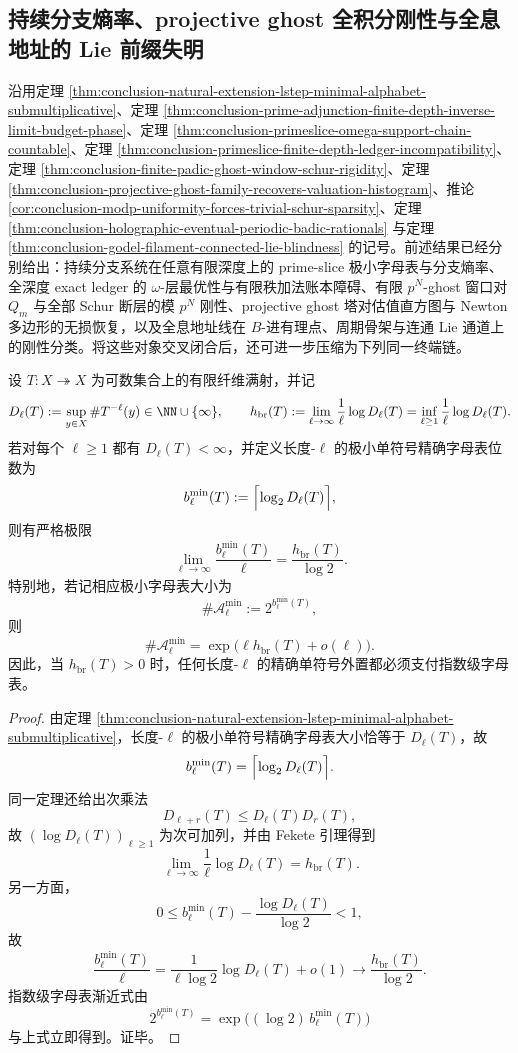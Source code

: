 \subsection{持续分支熵率、projective ghost 全积分刚性与全息地址的 Lie 前缀失明}\label{subsec:conclusion-primeslice-ghost-holographic-lie-zerorate}
沿用定理 \ref{thm:conclusion-natural-extension-lstep-minimal-alphabet-submultiplicative}、定理 \ref{thm:conclusion-prime-adjunction-finite-depth-inverse-limit-budget-phase}、定理 \ref{thm:conclusion-primeslice-omega-support-chain-countable}、定理 \ref{thm:conclusion-primeslice-finite-depth-ledger-incompatibility}、定理 \ref{thm:conclusion-finite-padic-ghost-window-schur-rigidity}、定理 \ref{thm:conclusion-projective-ghost-family-recovers-valuation-histogram}、推论 \ref{cor:conclusion-modp-uniformity-forces-trivial-schur-sparsity}、定理 \ref{thm:conclusion-holographic-eventual-periodic-badic-rationals} 与定理 \ref{thm:conclusion-godel-filament-connected-lie-blindness} 的记号。前述结果已经分别给出：持续分支系统在任意有限深度上的 prime-slice 极小字母表与分支熵率、全深度 exact ledger 的 \(\omega\)-层最优性与有限秩加法账本障碍、有限 \(p^N\)-ghost 窗口对 \(Q_m\) 与全部 Schur 断层的模 \(p^N\) 刚性、projective ghost 塔对估值直方图与 Newton 多边形的无损恢复，以及全息地址线在 \(B\)-进有理点、周期骨架与连通 Lie 通道上的刚性分类。将这些对象交叉闭合后，还可进一步压缩为下列同一终端链。

\begin{theorem}\label{thm:conclusion-branch-entropy-primeslice-rate}
设 \(T:X\twoheadrightarrow X\) 为可数集合上的有限纤维满射，并记
\[
D_\ell(T):=\sup_{y\in X}\#T^{-\ell}(y)\in \NN\cup\{\infty\},
\qquad
h_{\mathrm{br}}(T):=\lim_{\ell\to\infty}\frac{1}{\ell}\log D_\ell(T)
=
\inf_{\ell\ge 1}\frac{1}{\ell}\log D_\ell(T).
\]
若对每个 \(\ell\ge 1\) 都有 \(D_\ell(T)<\infty\)，并定义长度-\(\ell\) 的极小单符号精确字母表位数为
\[
b_\ell^{\min}(T):=\Bigl\lceil \log_2 D_\ell(T)\Bigr\rceil,
\]
则有严格极限
\[
\lim_{\ell\to\infty}\frac{b_\ell^{\min}(T)}{\ell}
=
\frac{h_{\mathrm{br}}(T)}{\log 2}.
\]
特别地，若记相应极小字母表大小为
\[
\#\mathcal A_\ell^{\min}:=2^{b_\ell^{\min}(T)},
\]
则
\[
\#\mathcal A_\ell^{\min}
=
\exp\!\bigl(\ell h_{\mathrm{br}}(T)+o(\ell)\bigr).
\]
因此，当 \(h_{\mathrm{br}}(T)>0\) 时，任何长度-\(\ell\) 的精确单符号外置都必须支付指数级字母表。
\end{theorem}
\begin{proof}
由定理 \ref{thm:conclusion-natural-extension-lstep-minimal-alphabet-submultiplicative}，长度-\(\ell\) 的极小单符号精确字母表大小恰等于 \(D_\ell(T)\)，故
\[
b_\ell^{\min}(T)=\Bigl\lceil \log_2 D_\ell(T)\Bigr\rceil.
\]
同一定理还给出次乘法
\[
D_{\ell+r}(T)\le D_\ell(T)D_r(T),
\]
故 \((\log D_\ell(T))_{\ell\ge 1}\) 为次可加列，并由 Fekete 引理得到
\[
\lim_{\ell\to\infty}\frac1\ell \log D_\ell(T)=h_{\mathrm{br}}(T).
\]
另一方面，
\[
0\le b_\ell^{\min}(T)-\frac{\log D_\ell(T)}{\log 2}<1,
\]
故
\[
\frac{b_\ell^{\min}(T)}{\ell}
=
\frac{1}{\ell\log 2}\log D_\ell(T)+o(1)
\longrightarrow
\frac{h_{\mathrm{br}}(T)}{\log 2}.
\]
指数级字母表渐近式由
\[
2^{b_\ell^{\min}(T)}
=
\exp\!\bigl((\log 2)\,b_\ell^{\min}(T)\bigr)
\]
与上式立即得到。证毕。
\end{proof}

